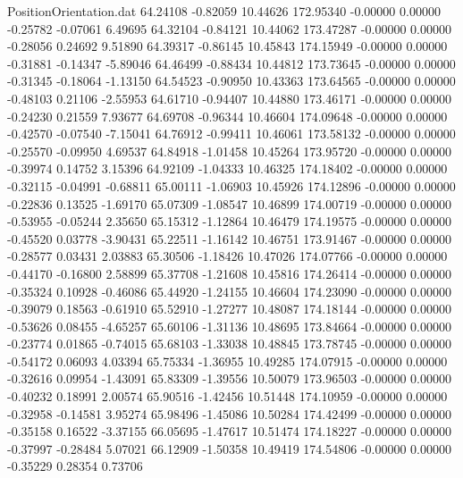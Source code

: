 \begin{filecontents}{PositionOrientation.dat}
  64.24108   -0.82059   10.44626   172.95340   -0.00000    0.00000   -0.25782   -0.07061    6.49695
  64.32104   -0.84121   10.44062   173.47287   -0.00000    0.00000   -0.28056    0.24692    9.51890
  64.39317   -0.86145   10.45843   174.15949   -0.00000    0.00000   -0.31881   -0.14347   -5.89046
  64.46499   -0.88434   10.44812   173.73645   -0.00000    0.00000   -0.31345   -0.18064   -1.13150
  64.54523   -0.90950   10.43363   173.64565   -0.00000    0.00000   -0.48103    0.21106   -2.55953
  64.61710   -0.94407   10.44880   173.46171   -0.00000    0.00000   -0.24230    0.21559    7.93677
  64.69708   -0.96344   10.46604   174.09648   -0.00000    0.00000   -0.42570   -0.07540   -7.15041
  64.76912   -0.99411   10.46061   173.58132   -0.00000    0.00000   -0.25570   -0.09950    4.69537
  64.84918   -1.01458   10.45264   173.95720   -0.00000    0.00000   -0.39974    0.14752    3.15396
  64.92109   -1.04333   10.46325   174.18402   -0.00000    0.00000   -0.32115   -0.04991   -0.68811
  65.00111   -1.06903   10.45926   174.12896   -0.00000    0.00000   -0.22836    0.13525   -1.69170
  65.07309   -1.08547   10.46899   174.00719   -0.00000    0.00000   -0.53955   -0.05244    2.35650
  65.15312   -1.12864   10.46479   174.19575   -0.00000    0.00000   -0.45520    0.03778   -3.90431
  65.22511   -1.16142   10.46751   173.91467   -0.00000    0.00000   -0.28577    0.03431    2.03883
  65.30506   -1.18426   10.47026   174.07766   -0.00000    0.00000   -0.44170   -0.16800    2.58899
  65.37708   -1.21608   10.45816   174.26414   -0.00000    0.00000   -0.35324    0.10928   -0.46086
  65.44920   -1.24155   10.46604   174.23090   -0.00000    0.00000   -0.39079    0.18563   -0.61910
  65.52910   -1.27277   10.48087   174.18144   -0.00000    0.00000   -0.53626    0.08455   -4.65257
  65.60106   -1.31136   10.48695   173.84664   -0.00000    0.00000   -0.23774    0.01865   -0.74015
  65.68103   -1.33038   10.48845   173.78745   -0.00000    0.00000   -0.54172    0.06093    4.03394
  65.75334   -1.36955   10.49285   174.07915   -0.00000    0.00000   -0.32616    0.09954   -1.43091
  65.83309   -1.39556   10.50079   173.96503   -0.00000    0.00000   -0.40232    0.18991    2.00574
  65.90516   -1.42456   10.51448   174.10959   -0.00000    0.00000   -0.32958   -0.14581    3.95274
  65.98496   -1.45086   10.50284   174.42499   -0.00000    0.00000   -0.35158    0.16522   -3.37155
  66.05695   -1.47617   10.51474   174.18227   -0.00000    0.00000   -0.37997   -0.28484    5.07021
  66.12909   -1.50358   10.49419   174.54806   -0.00000    0.00000   -0.35229    0.28354    0.73706

\end{filecontents}
